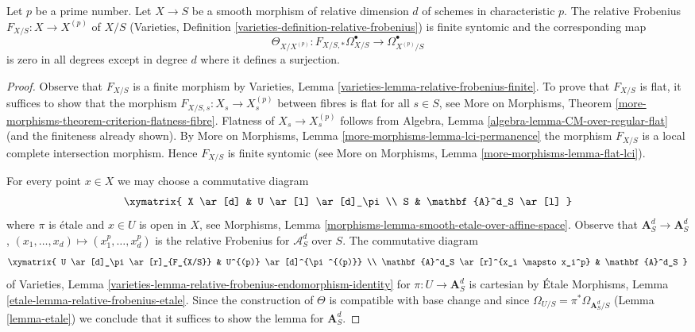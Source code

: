 \begin{lemma}
\label{lemma-Garel-map-frobenius-smooth-char-p}
Let $p$ be a prime number. Let $X \to S$ be a smooth morphism
of relative dimension $d$ of schemes in characteristic $p$.
The relative Frobenius $F_{X/S} : X \to X^{(p)}$ of $X/S$
(Varieties, Definition \ref{varieties-definition-relative-frobenius})
is finite syntomic and the corresponding map
$$
\Theta_{X/X^{(p)}} :
F_{X/S, *}\Omega^\bullet_{X/S} \to \Omega^\bullet_{X^{(p)}/S}
$$
is zero in all degrees except in degree $d$ where it defines a
surjection.
\end{lemma}

\begin{proof}
Observe that $F_{X/S}$ is a finite morphism by
Varieties, Lemma \ref{varieties-lemma-relative-frobenius-finite}.
To prove that $F_{X/S}$ is flat, it suffices to show that
the morphism $F_{X/S, s} : X_s \to X^{(p)}_s$ between fibres
is flat for all $s \in S$, see More on Morphisms, Theorem
\ref{more-morphisms-theorem-criterion-flatness-fibre}.
Flatness of $X_s \to X^{(p)}_s$ follows from
Algebra, Lemma \ref{algebra-lemma-CM-over-regular-flat}
(and the finiteness already shown).
By More on Morphisms, Lemma
\ref{more-morphisms-lemma-lci-permanence}
the morphism $F_{X/S}$ is a local complete intersection morphism.
Hence $F_{X/S}$ is finite syntomic (see
More on Morphisms, Lemma \ref{more-morphisms-lemma-flat-lci}).

\medskip\noindent
For every point $x \in X$ we may choose a commutative diagram
$$
\xymatrix{
X \ar[d] & U \ar[l] \ar[d]_\pi \\
S & \mathbf{A}^d_S \ar[l]
}
$$
where $\pi$ is \'etale and $x \in U$ is open in $X$, see
Morphisms, Lemma \ref{morphisms-lemma-smooth-etale-over-affine-space}.
Observe that
$\mathbf{A}^d_S \to \mathbf{A}^d_S$, $(x_1, \ldots, x_d) \mapsto
(x_1^p, \ldots, x_d^p)$ is the relative Frobenius for $\mathcal{A}^d_S$
over $S$. The commutative diagram
$$
\xymatrix{
U \ar[d]_\pi \ar[r]_{F_{X/S}} & U^{(p)} \ar[d]^{\pi^{(p)}} \\
\mathbf{A}^d_S \ar[r]^{x_i \mapsto x_i^p} & \mathbf{A}^d_S
}
$$
of
Varieties, Lemma \ref{varieties-lemma-relative-frobenius-endomorphism-identity}
for $\pi : U \to \mathbf{A}^d_S$ is cartesian by
\'Etale Morphisms, Lemma
\ref{etale-lemma-relative-frobenius-etale}.
Since the construction of $\Theta$ is compatible with base change
and since $\Omega_{U/S} = \pi^*\Omega_{\mathbf{A}^d_S/S}$
(Lemma \ref{lemma-etale})
we conclude that it suffices to show the lemma for
$\mathbf{A}^d_S$.


\end{proof}
